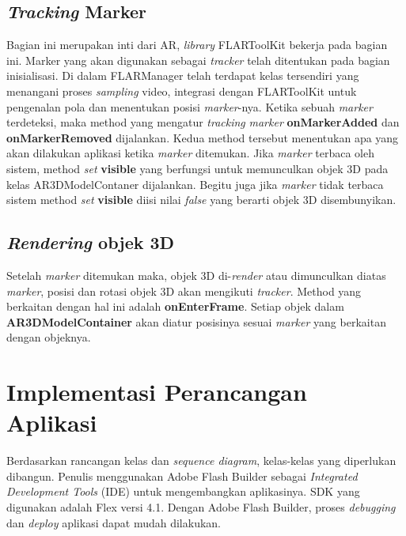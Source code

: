 \subsection{\textit{Tracking} Marker}
\label{subsec:tracking_marker}
Bagian ini merupakan inti dari AR, \textit{library} FLARToolKit bekerja pada bagian ini. Marker yang akan digunakan sebagai \textit{tracker} telah ditentukan pada bagian inisialisasi. Di dalam FLARManager telah terdapat kelas tersendiri yang menangani proses \textit{sampling} video, integrasi dengan FLARToolKit untuk pengenalan pola dan menentukan posisi \textit{marker}-nya. Ketika sebuah \textit{marker} terdeteksi, maka method yang mengatur \textit{tracking} \textit{marker} \textbf{onMarkerAdded} dan \textbf{onMarkerRemoved} dijalankan. Kedua method tersebut menentukan apa yang akan dilakukan aplikasi ketika \textit{marker} ditemukan. Jika \textit{marker} terbaca oleh sistem, method \textit{set} \textbf{visible} yang berfungsi untuk memunculkan objek 3D pada kelas AR3DModelContaner dijalankan. Begitu juga jika \textit{marker} tidak terbaca sistem method \textit{set} \textbf{visible} diisi nilai \textit{false} yang berarti objek 3D disembunyikan. %

\subsection{\textit{Rendering} objek 3D}
\label{subsec:render_objek3D}
Setelah \textit{marker} ditemukan maka, objek 3D di-\textit{render} atau dimunculkan diatas \textit{marker}, posisi dan rotasi objek 3D akan mengikuti \textit{tracker}. Method yang berkaitan dengan hal ini adalah \textbf{onEnterFrame}. Setiap objek dalam \textbf{AR3DModelContainer} akan diatur posisinya sesuai \textit{marker} yang berkaitan dengan objeknya.

\section {Implementasi Perancangan Aplikasi}
\label{sec:implementasi_perancangan_aplikasi}
Berdasarkan rancangan kelas dan \textit{sequence diagram}, kelas-kelas yang diperlukan dibangun. Penulis menggunakan Adobe Flash Builder sebagai \textit{Integrated Development Tools} (IDE) untuk mengembangkan aplikasinya. SDK yang digunakan adalah Flex versi 4.1. Dengan Adobe Flash Builder, proses \textit{debugging} dan \textit{deploy} aplikasi dapat mudah dilakukan.

